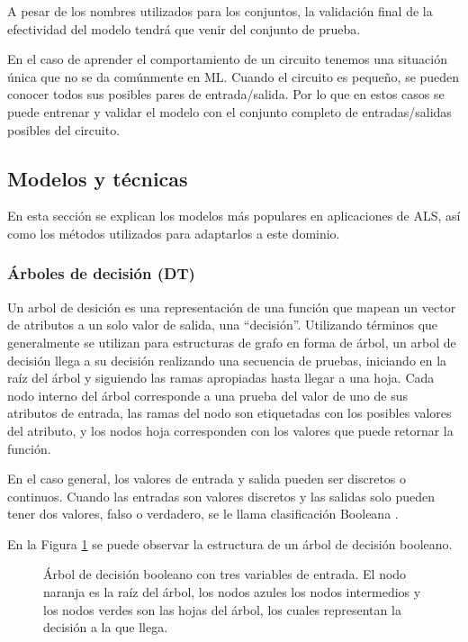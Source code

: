 A pesar de los nombres utilizados para los conjuntos, la validación final de la
efectividad del modelo tendrá que venir del conjunto de prueba.

En el caso de aprender el comportamiento de un circuito tenemos una situación
única que no se da comúnmente en ML. Cuando el circuito es pequeño, se pueden
conocer todos sus posibles pares de entrada/salida. Por lo que en estos casos
se puede entrenar y validar el modelo con el conjunto completo de
entradas/salidas posibles del circuito.

\subsection{Modelos y técnicas}

En esta sección se explican los modelos más populares en aplicaciones de ALS,
así como los métodos utilizados para adaptarlos a este dominio.

\subsubsection{Árboles de decisión (DT)}

Un arbol de desición es una representación de una función que mapean un vector
de atributos a un solo valor de salida, una ``decisión''. Utilizando términos
que generalmente se utilizan para estructuras de grafo en forma de árbol, un
arbol de decisión llega a su decisión realizando una secuencia de pruebas,
iniciando en la raíz del árbol y siguiendo las ramas apropiadas hasta llegar a
una hoja. Cada nodo interno del árbol corresponde a una prueba del valor de uno
de sus atributos de entrada, las ramas del nodo son etiquetadas con los
posibles valores del atributo, y los nodos hoja corresponden con los valores
que puede retornar la función.

En el caso general, los valores de entrada y salida pueden ser discretos o
continuos. Cuando las entradas son valores discretos y las salidas solo pueden
tener dos valores, falso o verdadero, se le llama clasificación Booleana
\cite{russell2016artificial}.

En la Figura \ref{fig:DT} se puede observar la estructura de un árbol de
decisión booleano.

\begin{figure}[htb]
  \centering
  
  \caption{Árbol de decisión booleano con tres variables de entrada. El nodo
    naranja es la raíz del árbol, los nodos azules los nodos intermedios y los
    nodos verdes son las hojas del árbol, los cuales representan la decisión a la
  que llega.}
  \label{fig:DT}
\end{figure}

